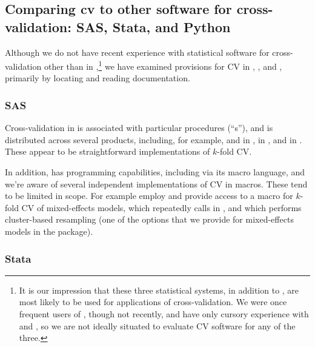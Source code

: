 \documentclass[
]{jss}
\begin{document}
\subsection{Comparing cv to other software for cross-validation: SAS,
Stata, and
Python}\label{comparing-cv-to-other-software-for-cross-validation-sas-stata-and-python}

Although we do not have recent experience with statistical software for
cross-validation other than in ,\footnote{It is our
  impression that these three statistical systems, in addition to
  , are most likely to be used for applications of
  cross-validation. We were once frequent users of ,
  though not recently, and have only cursory experience with
   and , so we are not ideally situated
  to evaluate CV software for any of the three.} we have examined
provisions for CV in , , and
, primarily by locating and reading documentation.

\subsubsection{SAS}\label{sas}

Cross-validation in  is associated with particular
procedures (``s''), and is distributed across several
products, including, for example,  and
 in  \citep{SAS-Stat:2020}, in
 \citep{SAS-Enterprise-Miner:2018}, and
in 
\citep{SAS-Visual-Data-Mining:2020}. These appear to be straightforward
implementations of \(k\)-fold CV.

In addition,  has programming capabilities, including via
its macro language, and we're aware of several independent
implementations of CV in  macros. These tend to be limited
in scope. For example \citet{Slaets-et-al:2014} employ and provide
access to a  macro for \(k\)-fold CV of mixed-effects
models, which repeatedly calls  in ,
and which performs cluster-based resampling (one of the options that we
provide for mixed-effects models in the  package).

\subsubsection{Stata}\label{stata}
\end{document}
